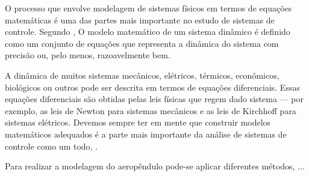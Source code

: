 O processo que envolve modelagem de sistemas físicos em termos de equações matemáticas é uma das partes mais importante no estudo de sistemas de controle. Segundo , O modelo matemático de um sistema dinâmico é definido como um conjunto de equações que representa a dinâmica do sistema com precisão ou, pelo menos, razoavelmente bem.

\begin{citacao}
	A dinâmica de muitos sistemas mecânicos, elétricos, térmicos, econômicos, biológicos ou
	outros pode ser descrita em termos de equações diferenciais. Essas equações diferenciais são	obtidas pelas leis físicas que regem dado sistema — por exemplo, as leis de Newton para sistemas mecânicos e as leis de Kirchhoff para sistemas elétricos. Devemos sempre ter em mente que construir modelos matemáticos adequados é a parte mais importante da análise de sistemas de controle como um todo, .
\end{citacao}

Para realizar a modelagem do aeropêndulo pode-se aplicar diferentes métodos, ...